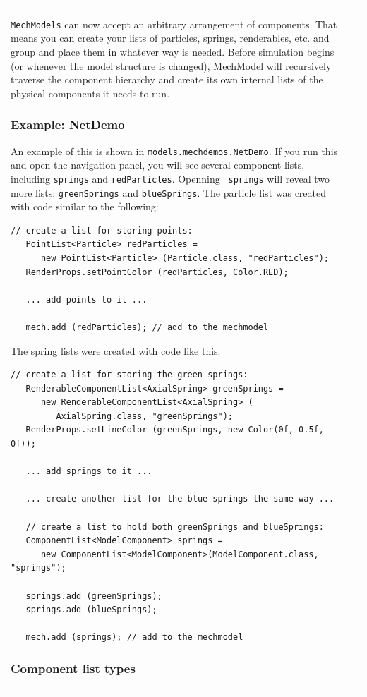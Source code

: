 \documentclass{article}
\begin{document}
\begin{tabular}{ll}
{\tt MechModels} can now accept an arbitrary arrangement of
components. That means you can create your lists of particles,
springs, renderables, etc. and group and place them in whatever way is
needed. Before simulation begins (or whenever the model structure is
changed), MechModel will recursively traverse the component hierarchy
and create its own internal lists of the physical components it needs
to run.

\subsubsection*{Example: NetDemo}

An example of this is shown in {\tt models.mechdemos.NetDemo}.  If you
run this and open the navigation panel, you will see several component
lists, including {\tt springs} and {\tt redParticles}. Openning {\tt
springs} will reveal two more lists: {\tt greenSprings} and
{\tt blueSprings}. The particle list was created with code
similar to the following:
\begin{lstlisting}[]
   // create a list for storing points:
   PointList<Particle> redParticles =
      new PointList<Particle> (Particle.class, "redParticles");
   RenderProps.setPointColor (redParticles, Color.RED);

   ... add points to it ...
  
   mech.add (redParticles); // add to the mechmodel
\end{lstlisting}
The spring lists were created with code like this:
\begin{lstlisting}[]
   // create a list for storing the green springs:
   RenderableComponentList<AxialSpring> greenSprings =
      new RenderableComponentList<AxialSpring> (
         AxialSpring.class, "greenSprings");
   RenderProps.setLineColor (greenSprings, new Color(0f, 0.5f, 0f));

   ... add springs to it ...

   ... create another list for the blue springs the same way ...

   // create a list to hold both greenSprings and blueSprings:
   ComponentList<ModelComponent> springs =
      new ComponentList<ModelComponent>(ModelComponent.class, "springs");

   springs.add (greenSprings);
   springs.add (blueSprings);
  
   mech.add (springs); // add to the mechmodel
\end{lstlisting}

\subsubsection*{Component list types}


\end{tabular}
\end{document}
